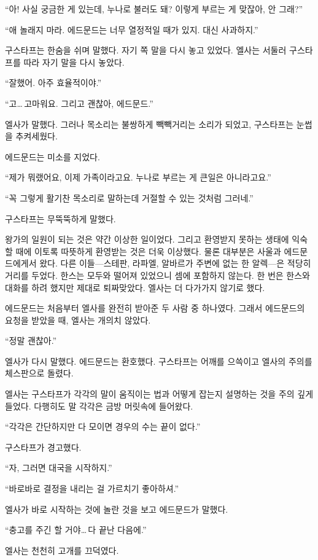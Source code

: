 ``아! 사실 궁금한 게 있는데, 누나로 불러도 돼? 이렇게 부르는 게 맞잖아, 안 그래?''

``애 놀래지 마라. 에드문드는 너무 열정적일 때가 있지. 대신 사과하지.''

구스타프는 한숨을 쉬며 말했다. 자기 쪽 말을 다시 놓고 있었다. 엘사는 서둘러 구스타프를 따라 자기 말을 다시 놓았다.

``잘했어. 아주 효율적이야.''

``고\ldots\,고마워요. 그리고 괜찮아, 에드문드.''

엘사가 말했다. 그러나 목소리는 불쌍하게 빽빽거리는 소리가 되었고, 구스타프는 눈썹을 추켜세웠다.

에드문드는 미소를 지었다.

``제가 뭐랬어요, 이제 가족이라고요. 누나로 부르는 게 큰일은 아니라고요.''

``꼭 그렇게 활기찬 목소리로 말하는데 거절할 수 있는 것처럼 그러네.''

구스타프는 무뚝뚝하게 말했다.

왕가의 일원이 되는 것은 약간 이상한 일이었다. 그리고 환영받지 못하는 생태에 익숙할 때에 이토록 따뜻하게 환영받는 것은 더욱 이상했다. 물론 대부분은 사울과 에드문드에게서 왔다. 다른 이들—스테판, 라파엘, 알바르가 주변에 없는 한 알렉—은 적당히 거리를 두었다. 한스는 모두와 떨어져 있었으니 셈에 포함하지 않는다. 한 번은 한스와 대화를 하려 했지만 제대로 퇴짜맞았다. 엘사는 더 다가가지 않기로 했다.

에드문드는 처음부터 엘사를 완전히 받아준 두 사람 중 하나였다. 그래서 에드문드의 요청을 받았을 때, 엘사는 개의치 않았다.

``정말 괜찮아.''

엘사가 다시 말했다. 에드문드는 환호했다. 구스타프는 어깨를 으쓱이고 엘사의 주의를 체스판으로 돌렸다.

엘사는 구스타프가 각각의 말이 움직이는 법과 어떻게 잡는지 설명하는 것을 주의 깊게 들었다. 다행히도 말 각각은 금방 머릿속에 들어왔다.

``각각은 간단하지만 다 모이면 경우의 수는 끝이 없다.''

구스타프가 경고했다.

``자, 그러면 대국을 시작하지.''

``바로바로 결정을 내리는 걸 가르치기 좋아하셔.''

엘사가 바로 시작하는 것에 놀란 것을 보고 에드문드가 말했다.

``충고를 주긴 할 거야\ldots\,다 끝난 다음에.''

엘사는 천천히 고개를 끄덕였다.

